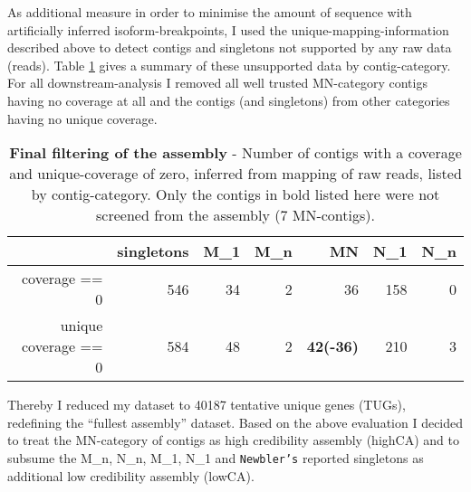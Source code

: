 As additional measure in order to minimise the amount of sequence with
artificially inferred isoform-breakpoints, I used the
unique-mapping-information described above to detect contigs and
singletons not supported by any raw data (reads). Table
\ref{tab:cov.ex} gives a summary of these unsupported data by
contig-category. For all downstream-analysis I removed all well
trusted MN-category contigs having no coverage at all and the contigs
(and singletons) from other categories having no unique coverage.

\begin{table}[ht]
\begin{center}
\begin{tabular}{rrrrrrr}
  \hline
  & singletons & M\_1 & M\_n & MN & N\_1 & N\_n \\ 
  \hline
  coverage == 0 & 546 &  34 &  2 &  36 & 158 &  0 \\ 
  unique coverage == 0 & 584 &  48 &   2 &  \textbf{42(-36)} & 210 &   3 \\ 
  \hline
\end{tabular}
\caption[Final filtering of the assembly]{\textbf{Final filtering of
    the assembly} - Number of contigs with a coverage and
  unique-coverage of zero, inferred from mapping of raw reads, listed
  by contig-category. Only the contigs in bold listed here were not
  screened from the assembly (7 MN-contigs).}
\label{tab:cov.ex}
\end{center}
\end{table}

Thereby I reduced my dataset to 40187 tentative unique genes (TUGs),
redefining the ``fullest assembly'' dataset. Based on the above
evaluation I decided to treat the MN-category of contigs as high
credibility assembly (highCA) and to subsume the M\_n, N\_n, M\_1,
N\_1 and \texttt{Newbler's} reported singletons as additional low
credibility assembly (lowCA).

